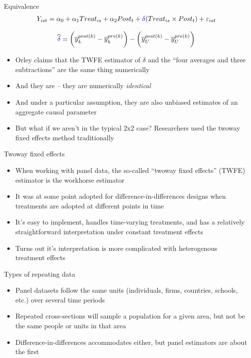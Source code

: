 \documentclass{beamer}
\begin{document}
\begin{frame}{Equivalence}
$$Y_{ist} = \alpha_0 + \alpha_1 Treat_{is} + \alpha_2 Post_{t} + \textcolor{blue}{\delta} (Treat_{is} \times Post_t) + \varepsilon_{ist} $$

\bigskip

$$\widehat{\textcolor{blue}{\delta}} = \bigg ( \overline{y}_k^{post(k)} - \overline{y}_k^{pre(k)} \bigg ) - \bigg ( \overline{y}_U^{post(k)} - \overline{y}_U^{pre(k)} \bigg ) $$

\begin{itemize}
\item Orley claims that the TWFE estimator of $\delta$ and the ``four averages and three subtractions'' are the same thing numerically
\item And they are -- they are numerically \emph{identical}
\item And under a particular assumption, they are also unbiased estimates of an aggregate causal parameter
\item But what if we aren't in the typical 2x2 case? Researchers used the twoway fixed effects method traditionally
\end{itemize}

\end{frame}









\begin{frame}{Twoway fixed effects}

\begin{itemize}
\item When working with panel data, the so-called ``twoway fixed effects'' (TWFE) estimator is the workhorse estimator
\item It was at some point adopted for difference-in-differences designs when treatments are adopted at different points in time 
\item It's easy to implement, handles time-varying treatments, and has a relatively straightforward interpretation under constant treatment effects
\item Turns out it's interpretation is more complicated with heterogenous treatment effects
\end{itemize}

\end{frame}


\begin{frame}{Types of repeating data}

	\begin{itemize}
	\item Panel datasets follow the same units (individuals, firms, countries, schools, etc.) over several time periods
	\item Repeated cross-sections will sample a population for a given area, but not be the same people or units in that area
	\item Difference-in-differences accommodates either, but panel estimators are about the first 
	\end{itemize}
\end{frame}
\end{document}
